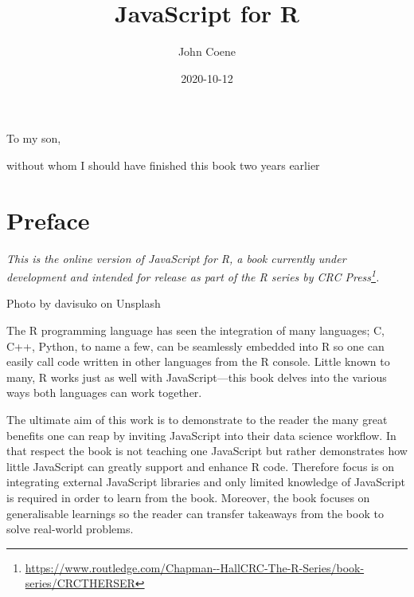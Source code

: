 \documentclass[
]{krantz}
\title{JavaScript for R}
\author{John Coene}
\date{2020-10-12}
\renewcommand{\href}[2]{#2\footnote{\url{#1}}}
\begin{document}
\maketitle


\thispagestyle{empty}

\begin{center}
To my son,

without whom I should have finished this book two years earlier
\end{center}

\setlength{\abovedisplayskip}{-5pt}
\setlength{\abovedisplayshortskip}{-5pt}

{
\hypersetup{linkcolor=}
\setcounter{tocdepth}{2}
\tableofcontents
}
\listoftables
\listoffigures
\hypertarget{preface}{%
\chapter*{Preface}\label{preface}}


\emph{This is the online version of JavaScript for R, a book currently under development and intended for release as part of the \href{https://www.routledge.com/Chapman--HallCRC-The-R-Series/book-series/CRCTHERSER}{R series by CRC Press}.}

{Photo by davisuko on Unsplash}

The R programming language has seen the integration of many languages; C, C++, Python, to name a few, can be seamlessly embedded into R so one can easily call code written in other languages from the R console. Little known to many, R works just as well with JavaScript---this book delves into the various ways both languages can work together.

The ultimate aim of this work is to demonstrate to the reader the many great benefits one can reap by inviting JavaScript into their data science workflow. In that respect the book is not teaching one JavaScript but rather demonstrates how little JavaScript can greatly support and enhance R code. Therefore focus is on integrating external JavaScript libraries and only limited knowledge of JavaScript is required in order to learn from the book. Moreover, the book focuses on generalisable learnings so the reader can transfer takeaways from the book to solve real-world problems.
\end{document}
